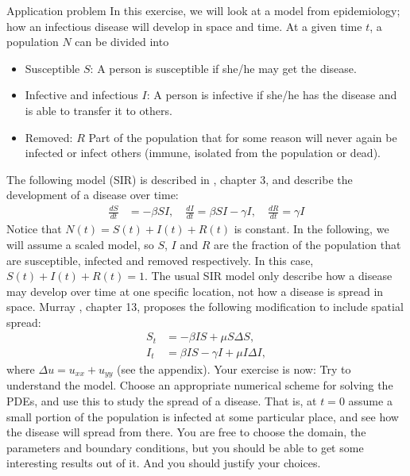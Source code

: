 \begin{railingbox}{Application problem}
  In this exercise, we will look at a model from epidemiology; how an infectious disease will develop in space and time.
  At a given time \(t\), a population \(N\) can be divided into
  \begin{itemize}
    \item Susceptible \(S\): A person is susceptible if she/he may get the disease.
    \item Infective and infectious \(I\): A person is infective if she/he has the disease and is able to transfer it to others.
    \item Removed: \(R\) Part of the population that for some reason will never again be infected or infect others (immune, isolated from the population or dead).
  \end{itemize}
  The following model (SIR) is described in \cite{murray2002mathematical}, chapter 3, and describe the development of a disease over time:
  \begin{align}
    \frac{dS}{dt} & = -\beta SI, \quad \frac{dI}{dt} = \beta SI - \gamma I, \quad \frac{dR}{dt} = \gamma I  \label{eq:sir_model}
  \end{align}
  Notice that \(N(t) = S(t) + I(t) + R(t)\) is constant.
  In the following, we will assume a scaled model, so \(S\), \(I\) and \(R\) are the fraction of the population that are susceptible, infected and removed respectively. In this case, \(S(t) + I(t) + R(t) = 1\).
  The usual SIR model only describe how a disease may develop over time at one specific location, not how a disease is spread in space. Murray \cite{murray2002mathematical}, chapter 13, proposes the following modification to include spatial spread:
  \begin{align}
    S_t & = -\beta IS + \mu S \Delta S, \nonumber                            \\
    I_t & = \beta IS - \gamma I + \mu I \Delta I, \label{eq:sir_model_space}
  \end{align}
  where \(\Delta u = u_{xx} + u_{yy}\) (see the appendix). Your exercise is now: Try to understand the
  model. Choose an appropriate numerical scheme for solving the PDEs, and use this to study the spread of a disease. That is, at \(t = 0\) assume a small portion of the population is infected at some particular place, and see how the disease
  will spread from there. You are free to choose the domain, the parameters and boundary conditions, but you should be able to get some interesting results out of it. And you should justify your choices.

\end{railingbox}
